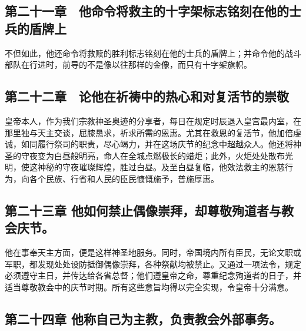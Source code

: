 
\subsection{第二十一章　他命令将救主的十字架标志铭刻在他的士兵的盾牌上}

不但如此，他还命令将救赎的胜利标志铭刻在他的士兵的盾牌上；并命令他的战斗部队在行进时，前导的不是像以往那样的金像，而只有十字架旗帜。\par


\subsection{第二十二章　论他在祈祷中的热心和对复活节的崇敬}

皇帝本人，作为我们宗教神圣奥迹的分享者，每日在规定时辰退入皇宫最内室，在那里独与天主交谈，屈膝恳求，祈求所需的恩惠。尤其在救恩的复活节，他加倍虔诚，如同履行祭司的职责，尽心竭力，并在这场庆节的纪念中超越众人。他还将神圣的守夜变为白昼般明亮，命人在全城点燃极长的蜡炬；此外，火炬处处散布光明，使这神秘的守夜璀璨辉煌，胜过白昼。及至白昼复临，他效法救主的恩慈行为，向各个民族、行省和人民的臣民慷慨施予，普施厚惠。\par


\subsection{第二十三章 他如何禁止偶像崇拜，却尊敬殉道者与教会庆节。}

他在事奉天主方面，便是这样神圣地服务。同时，帝国境内所有臣民，无论文职或军职，都发现处处设防抵御偶像崇拜，各种祭献均被禁止。又通过一项法令，规定必须遵守主日，并传达给各省总督；他们遵皇帝之命，尊重纪念殉道者的日子，并适当尊敬教会中的庆节时期。所有这些意旨均得以完全实现，令皇帝十分满意。\par


\subsection{第二十四章 他称自己为主教，负责教会外部事务。}

